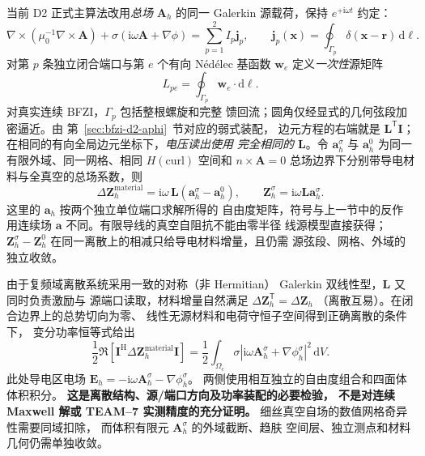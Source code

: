 当前 D2 正式主算法改用\emph{总场} $\bm A_h$ 的同一
Galerkin 源载荷，保持 $e^{+\mathrm i\omega t}$ 约定：
\begin{equation}
 \nabla\times(\mu_0^{-1}\nabla\times\bm A)
   +\sigma(\mathrm i\omega\bm A+\nabla\phi)
       =\sum_{p=1}^2 I_p\bm j_p,
 \qquad \bm j_p(\bm x)
   =\oint_{\Gamma_p}\delta(\bm x-\bm r)\,\mathrm d\bm\ell .
\end{equation}
对第 $p$ 条独立闭合端口与第 $e$ 个有向
N\'ed\'elec 基函数 $\bm w_e$ 定义\emph{一次性}源矩阵
\begin{equation}
  \boxed{L_{pe}=\oint_{\Gamma_p}\bm w_e\cdot
        \mathrm d\bm\ell.}
\end{equation}
对真实连续 BFZI，$\Gamma_p$ 包括整根螺旋和完整
馈回流；圆角仅经显式的几何弦段加密逼近。由
第~\ref{sec:bfzi-d2-aphi}~节对应的弱式装配，
边元方程的右端就是 $\bm L^{\mathsf T}\bm I$；
在相同的有向全局边元坐标下，\emph{电压读出使用
完全相同的 $\bm L$}。令 $\bm a_h^\sigma$ 与
$\bm a_h^0$ 为同一有限外域、同一网格、相同
$H(\mathrm{curl})$ 空间和 $n\times\bm A=0$
总场边界下分别带导电材料与全真空的总场系数，则
\begin{equation}
 \boxed{
 \Delta\bm Z_h^{\mathrm{material}}
   =\mathrm i\omega\,\bm L
    (\bm a_h^\sigma-\bm a_h^0),\qquad
 \bm Z_h^\sigma=\mathrm i\omega\bm L\bm a_h^\sigma .
 }
\end{equation}
这里的 $\bm a_h$ 按两个独立单位端口求解所得的
自由度矩阵，符号与上一节中的反作用连续场
$\bm a$ 不同。有限导线的真空自阻抗不能由零半径
线源模型直接获得；$\bm Z_h^\sigma-\bm Z_h^0$
在同一离散上的相减只给导电材料增量，且仍需
源弦段、网格、外域的独立收敛。

由于复频域离散系统采用一致的对称（非 Hermitian）
Galerkin 双线性型，$\bm L$ 又同时负责激励与
源端口读取，材料增量自然满足
$\Delta\bm Z_h^{\mathsf T}=\Delta\bm Z_h$
（离散互易）。在闭合边界上的总势切向为零、
线性无源材料和电荷守恒子空间得到正确离散的条件下，
变分功率恒等式给出
\begin{equation}
 \boxed{
 \frac12\Re\left[
 \bm I^{\mathrm H}\Delta\bm Z_h^{\mathrm{material}}\bm I
 \right]
 =\frac12\int_{\Omega_c}\sigma
  \left|\mathrm i\omega\bm A_h^\sigma
       +\nabla\phi_h^\sigma\right|^2\,\mathrm dV .
 }
\end{equation}
此处导电区电场
$\bm E_h=-\mathrm i\omega\bm A_h^\sigma-\nabla\phi_h^\sigma$。
两侧使用相互独立的自由度组合和四面体体积积分。
\textbf{这是离散结构、源/端口方向及功率装配的必要检验，
不是对连续 Maxwell 解或 TEAM--7 实测精度的充分证明。}
细丝真空自场的数值网格奇异性需要同域扣除，
而体积有限元 $\bm A_h^\sigma$ 的外域截断、趋肤
空间层、独立测点和材料几何仍需单独收敛。

